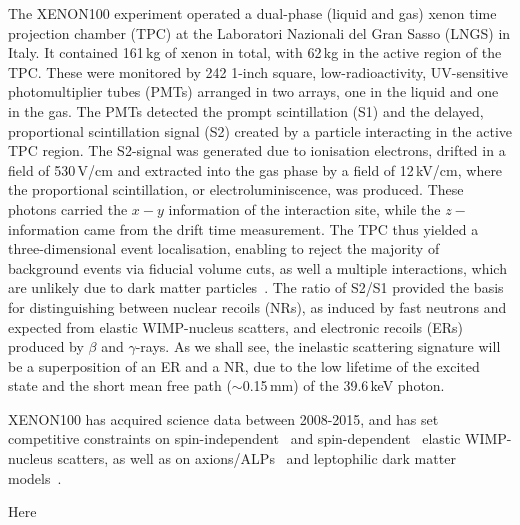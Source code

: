 The XENON100 experiment operated a dual-phase (liquid and gas) xenon time projection chamber (TPC) at the Laboratori Nazionali 
del Gran Sasso (LNGS) in Italy. It contained 161\,kg of xenon in total,  with  62\,kg in the active region of the TPC. These 
were monitored by 242 1-inch square, low-radioactivity, UV-sensitive photomultiplier tubes (PMTs) arranged in two arrays, one in the liquid 
and one in the gas. The PMTs detected the prompt scintillation (S1) and the delayed, proportional scintillation signal (S2) 
created by a particle interacting in the active TPC region. The S2-signal was generated due to ionisation electrons, drifted 
in a field of 530\,V/cm and extracted into the gas phase by a field of 12\,kV/cm, where the proportional scintillation, or electroluminiscence, 
was produced. These photons carried the $x-y$ information of the interaction site, while the $z-$information came from the drift time measurement. The TPC 
thus yielded a three-dimensional event localisation, enabling to reject the majority of background events via fiducial volume 
cuts, as well a multiple interactions, which are unlikely due to dark matter particles~\cite{Aprile:2011dd}. The ratio of 
S2/S1 provided the basis for distinguishing between nuclear recoils (NRs), as induced by fast neutrons and expected from 
elastic WIMP-nucleus scatters, and electronic recoils (ERs) produced by $\beta$ and $\gamma$-rays. As we shall see, the 
inelastic scattering signature will be a superposition of an ER and a NR, due to the low lifetime of the excited state and 
the short mean free path ($\sim$0.15\,mm) of the 39.6\,keV photon. 

XENON100 has acquired science data between 2008-2015, and has set competitive constraints on spin-independent~\cite{Aprile:2012nq,Aprile:2016swn} 
and spin-dependent~\cite{Aprile:2013doa,Aprile:2016swn} elastic WIMP-nucleus 
scatters, as well as on axions/ALPs~\cite{Aprile:2014eoa} and leptophilic dark matter models~\cite{Aprile:2015ade,Aprile:2015ibr,Aprile:2017yea}.

Here 